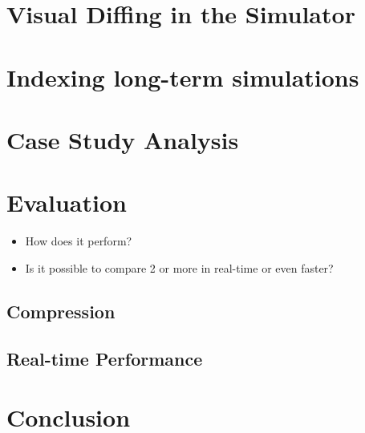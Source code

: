 \section{Visual Diffing in the Simulator} %
\label{sec:visual_diffing}


\section{Indexing long-term simulations} %
\label{sec:indexing_long_term_simulations}

\section{Case Study Analysis}
\label{sec:Case Study Analysis}

\section{Evaluation}
\label{sec:Evaluation}
\begin{itemize}
  \item How does it perform?
  \item Is it possible to compare 2 or more in real-time or even faster?
\end{itemize}

\subsection{Compression} %
\label{sub:compression}


\subsection{Real-time Performance} %
\label{sub:real_time_performance}


\section{Conclusion}
\label{sec:Conclusion}
